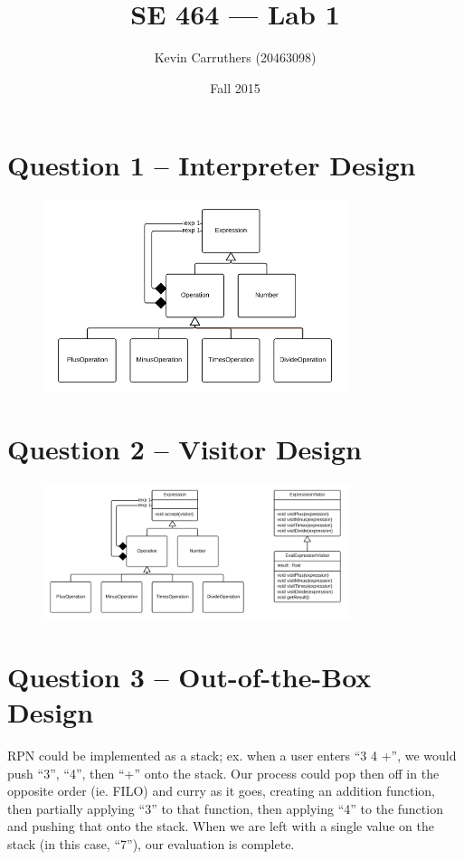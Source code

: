 \documentclass[12pt]{article}
\begin{document}
\title{SE 464 --- Lab 1}
\author{Kevin Carruthers (20463098)}
\date{\vspace{-2ex}Fall 2015}
\maketitle\HRule

\section{Question 1 -- Interpreter Design}
\begin{figure}[ht]
\centering
\includegraphics[width=0.8\textwidth]{lab1interpreter.png}
\end{figure}

\newpage

\section{Question 2 -- Visitor Design}
\begin{figure}[ht]
\centering
\includegraphics[width=0.8\textwidth]{lab1visitor.png}
\end{figure}

\section{Question 3 -- Out-of-the-Box Design}
RPN could be implemented as a stack; ex. when a user enters ``3 4 +'', we would push ``3'', ``4'', then ``+'' onto the stack. Our process could pop then off in the opposite order (ie. FILO) and curry as it goes, creating an addition function, then partially applying ``3'' to that function, then applying ``4'' to the function and pushing that onto the stack. When we are left with a single value on the stack (in this case, ``7''), our evaluation is complete.
\end{document}

